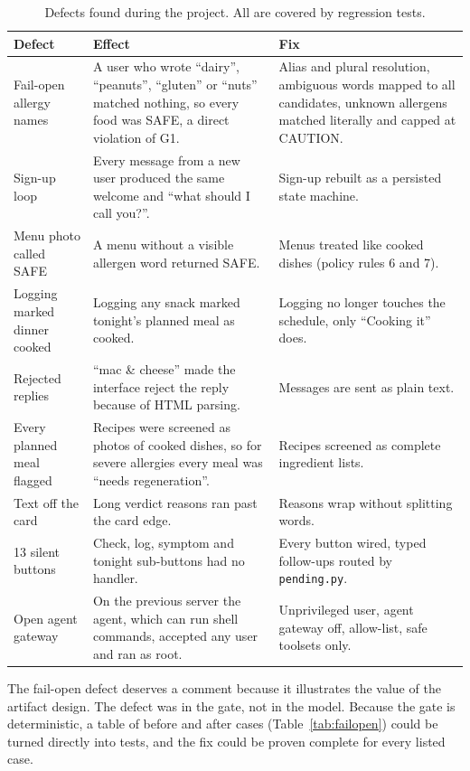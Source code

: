 \documentclass[11pt,a4paper]{article}
\begin{document}
\begin{table}[H]
\centering\small
\caption{Defects found during the project. All are covered by regression tests.}
\label{tab:defects}
\begin{tabularx}{\textwidth}{@{}l Y Y@{}}
\toprule
Defect & Effect & Fix \\
\midrule
Fail-open allergy names & A user who wrote ``dairy'', ``peanuts'', ``gluten'' or ``nuts'' matched nothing,
  so every food was SAFE, a direct violation of G1. & Alias and plural resolution, ambiguous words mapped
  to all candidates, unknown allergens matched literally and capped at CAUTION. \\
Sign-up loop & Every message from a new user produced the same welcome and ``what should I call you?''. &
  Sign-up rebuilt as a persisted state machine. \\
Menu photo called SAFE & A menu without a visible allergen word returned SAFE. & Menus treated like cooked
  dishes (policy rules 6 and 7). \\
Logging marked dinner cooked & Logging any snack marked tonight's planned meal as cooked. & Logging no longer
  touches the schedule, only ``Cooking it'' does. \\
Rejected replies & ``mac \& cheese'' made the interface reject the reply because of HTML parsing. &
  Messages are sent as plain text. \\
Every planned meal flagged & Recipes were screened as photos of cooked dishes, so for severe allergies every
  meal was ``needs regeneration''. & Recipes screened as complete ingredient lists. \\
Text off the card & Long verdict reasons ran past the card edge. & Reasons wrap without splitting words. \\
13 silent buttons & Check, log, symptom and tonight sub-buttons had no handler. & Every button wired, typed
  follow-ups routed by \texttt{pending.py}. \\
Open agent gateway & On the previous server the agent, which can run shell commands, accepted any user and
  ran as root. & Unprivileged user, agent gateway off, allow-list, safe toolsets only. \\
\bottomrule
\end{tabularx}
\end{table}

The fail-open defect deserves a comment because it illustrates the value of the artifact design. The
defect was in the gate, not in the model. Because the gate is deterministic, a table of before and after
cases (Table~\ref{tab:failopen}) could be turned directly into tests, and the fix could be proven
complete for every listed case.
\end{document}
